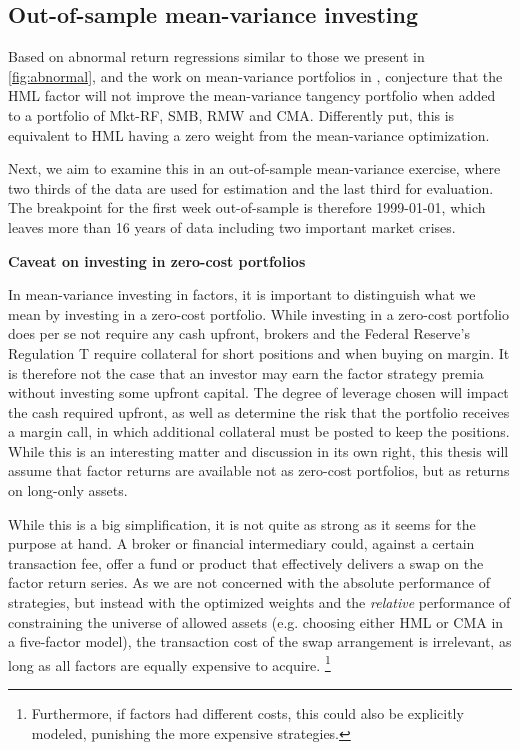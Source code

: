 
\subsection{Out-of-sample mean-variance investing}
\label{subsec:mean_variance}

Based on abnormal return regressions similar to those we present in \autoref{fig:abnormal}, and the work on mean-variance portfolios in \textcite{HubermanKandel1987}, \textcite{FF2015} conjecture that the HML factor will not improve the mean-variance tangency portfolio when added to a portfolio of Mkt-RF, SMB, RMW and CMA. Differently put, this is equivalent to HML having a zero weight from the mean-variance optimization. 

Next, we aim to examine this in an out-of-sample mean-variance exercise, where two thirds of the data are used for estimation and the last third for evaluation. The breakpoint for the first week out-of-sample is therefore 1999-01-01, which leaves more than 16 years of data including two important market crises.

\textbf{Caveat on investing in zero-cost portfolios}

In mean-variance investing in factors, it is important to distinguish what we mean by investing in a zero-cost portfolio. While investing in a zero-cost portfolio does per se not require any cash upfront, brokers and the Federal Reserve's Regulation T require collateral for short positions and when buying on margin. It is therefore not the case that an investor may earn the factor strategy premia without investing some upfront capital. The degree of leverage chosen will impact the cash required upfront, as well as determine the risk that the portfolio receives a margin call, in which additional collateral must be posted to keep the positions. While this is an interesting matter and discussion in its own right, this thesis will assume that factor returns are available not as zero-cost portfolios, but as returns on long-only assets.

While this is a big simplification, it is not quite as strong as it seems for the purpose at hand. A broker or financial intermediary could, against a certain transaction fee, offer a fund or product that effectively delivers a swap on the factor return series. As we are not concerned with the absolute performance of strategies, but instead with the optimized weights and the \emph{relative} performance of constraining the universe of allowed assets (e.g. choosing either HML or CMA in a five-factor model), the transaction cost of the swap arrangement is irrelevant, as long as all factors are equally expensive to acquire. \footnote{Furthermore, if factors had different costs, this could also be explicitly modeled, punishing the more expensive strategies.}


